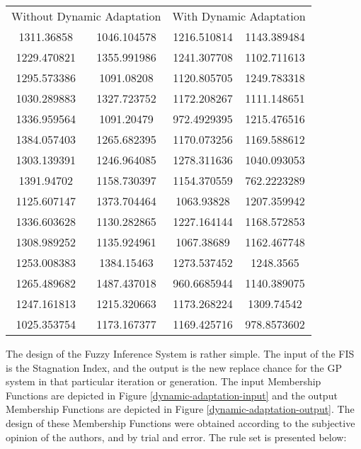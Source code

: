\documentclass[12pt,journal,draftcls,onecolumn]{IEEEtran}
\begin{document}
\begin{table}
    \label{dynamic-vs-non-dynamic-table}
    \begin{tabular}{ c c | c c}
        \multicolumn{2}{c}{Without Dynamic Adaptation} & \multicolumn{2}{c}{With Dynamic Adaptation} \\ 
         1311.36858  & 1046.104578 & 1216.510814 & 1143.389484 \\ 
         1229.470821 & 1355.991986 & 1241.307708 & 1102.711613 \\ 
         1295.573386 & 1091.08208  & 1120.805705 & 1249.783318 \\ 
         1030.289883 & 1327.723752 & 1172.208267 & 1111.148651 \\ 
         1336.959564 & 1091.20479  & 972.4929395 & 1215.476516 \\ 
         1384.057403 & 1265.682395 & 1170.073256 & 1169.588612 \\ 
         1303.139391 & 1246.964085 & 1278.311636 & 1040.093053 \\ 
         1391.94702  & 1158.730397 & 1154.370559 & 762.2223289 \\ 
         1125.607147 & 1373.704464 & 1063.93828  & 1207.359942 \\ 
         1336.603628 & 1130.282865 & 1227.164144 & 1168.572853 \\
         1308.989252 & 1135.924961 & 1067.38689  & 1162.467748 \\
         1253.008383 & 1384.15463  & 1273.537452 & 1248.3565   \\
         1265.489682 & 1487.437018 & 960.6685944 & 1140.389075 \\
         1247.161813 & 1215.320663 & 1173.268224 & 1309.74542  \\
         1025.353754 & 1173.167377 & 1169.425716 & 978.8573602 \\
    \end{tabular} 
\end{table}

The design of the Fuzzy Inference System is rather simple. The input of the FIS is the Stagnation Index, and the output is the new replace chance for the GP system in that particular iteration or generation. The input Membership Functions are depicted in Figure \ref{dynamic-adaptation-input} and the output Membership Functions are depicted in Figure \ref{dynamic-adaptation-output}. The design of these Membership Functions were obtained according to the subjective opinion of the authors, and by trial and error. The rule set is presented below:
\end{document}
